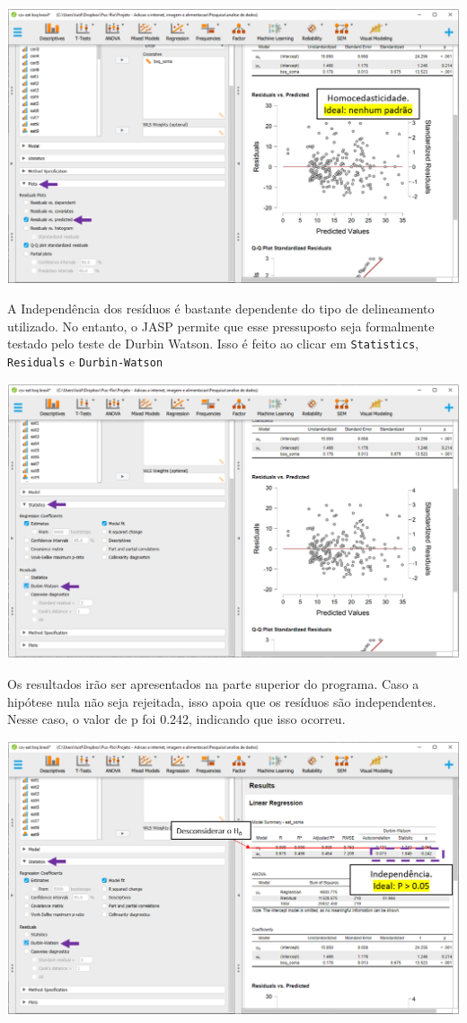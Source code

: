 \documentclass[
]{book}
\begin{document}
\includegraphics{./img/cap_reg_homocedasticidade_jasp.png}

A Independência dos resíduos é bastante dependente do tipo de
delineamento utilizado. No entanto, o JASP permite que esse pressuposto
seja formalmente testado pelo teste de Durbin Watson. Isso é feito ao
clicar em \texttt{Statistics}, \texttt{Residuals} e
\texttt{Durbin-Watson}

\includegraphics{./img/cap_reg_independencia_jasp.png}

Os resultados irão ser apresentados na parte superior do programa. Caso
a hipótese nula não seja rejeitada, isso apoia que os resíduos são
independentes. Nesse caso, o valor de p foi 0.242, indicando que isso
ocorreu.

\includegraphics{./img/cap_reg_independencia2_jasp.png}
\end{document}
